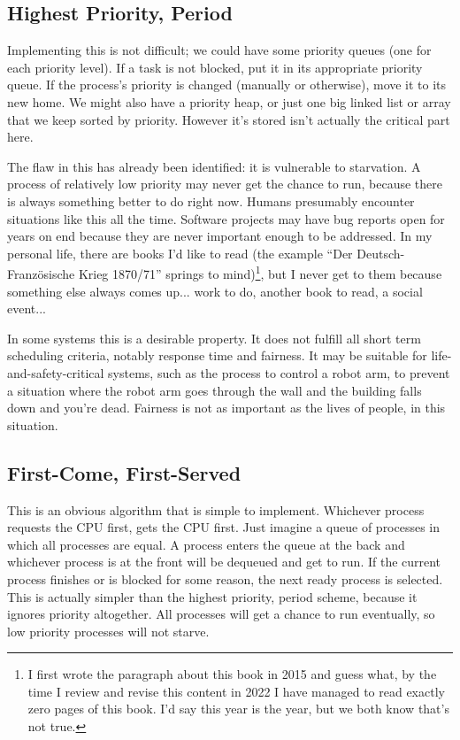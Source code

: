 \subsection*{Highest Priority, Period}

Implementing this is not difficult; we could have some priority queues (one for each priority level). If a task is not blocked, put it in its appropriate priority queue. If the process's priority is changed (manually or otherwise), move it to its new home. We might also have a priority heap, or just one big linked list or array that we keep sorted by priority. However it's stored isn't actually the critical part here.

The flaw in this has already been identified: it is vulnerable to starvation. A process of relatively low priority may never get the chance to run, because there is always something better to do right now. Humans presumably encounter situations like this all the time. Software projects may have bug reports open for years on end because they are never important enough to be addressed. In my personal life, there are books I'd like to read (the example ``Der Deutsch-Franz\"osische Krieg 1870/71'' springs to mind)\footnote{I first wrote the paragraph about this book in 2015 and guess what, by the time I review and revise this content in 2022 I have managed to read exactly zero pages of this book. I'd say this year is the year, but we both know that's not true.}, but I never get to them because something else always comes up... work to do, another book to read, a social event...

In some systems this is a desirable property. It does not fulfill all short term scheduling criteria, notably response time and fairness. It may be suitable for life-and-safety-critical systems, such as the process to control a robot arm, to prevent a situation where the robot arm goes through the wall and the building falls down and you're dead. Fairness is not as important as the lives of people, in this situation.

\subsection*{First-Come, First-Served}
This is an obvious algorithm that is simple to implement. Whichever process requests the CPU first, gets the CPU first. Just imagine a queue of processes in which all processes are equal. A process enters the queue at the back and whichever process is at the front will be dequeued and get to run.  If the current process finishes or is blocked for some reason, the next ready process is selected. This is actually simpler than the highest priority, period scheme, because it ignores priority altogether. All processes will get a chance to run eventually, so low priority processes will not starve.

